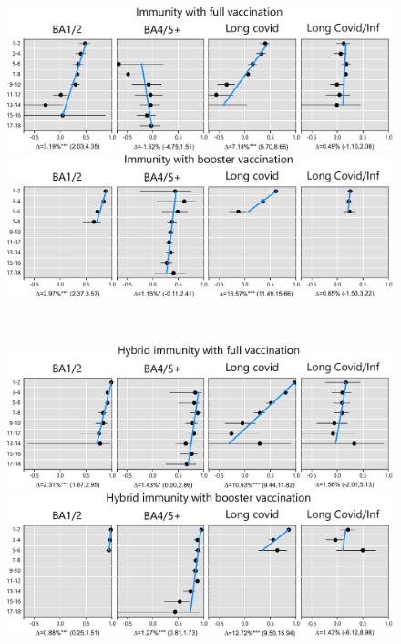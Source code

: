 \documentclass[sn-basic]{sn-jnl}%
\theoremstyle{thmstyleone}%
\theoremstyle{thmstyletwo}%
\theoremstyle{thmstylethree}%
\begin{document}
\begin{figure}
    \centering
  \begin{minipage}[b]{0.48\textwidth}
    \centering
    \includegraphics[width=\textwidth]{full_FINAL.pdf}
  \end{minipage}%
  \hfill
  \begin{minipage}[b]{0.48\textwidth}
    \centering
    \includegraphics[width=\textwidth]{booster_FINAL.pdf}
  \end{minipage}
\vspace{3mm}\\
  \begin{minipage}[b]{0.48\textwidth}
    \centering
    \includegraphics[width=\textwidth]{hybridfull_FINAL.pdf}
  \end{minipage}%
  \hfill
  \begin{minipage}[b]{0.48\textwidth}
    \centering
    \includegraphics[width=\textwidth]{hybridbooster_FINAL.pdf}

\end{minipage}
\end{figure}
\end{document}
